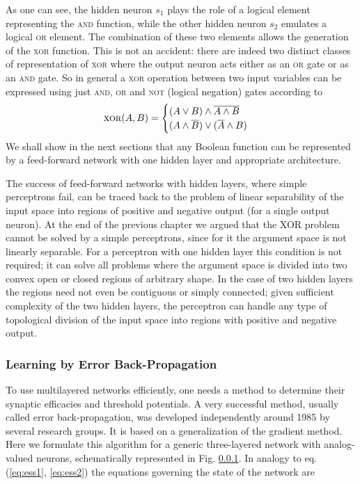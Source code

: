 As one can see, the hidden neuron $s_1$ plays the role of a logical element representing the \textsc{and} function, while the other hidden neuron $s_2$ emulates a logical \textsc{or} element. The combination of these two elements allows the generation of the \textsc{xor} function. This is not an accident: there are indeed two distinct classes of representation of \textsc{xor} where the output neuron acts either as an \textsc{or} gate or as an \textsc{and} gate. So in general a \textsc{xor} operation between two input variables can be expressed using just \textsc{and}, \textsc{or} and \textsc{not} (logical negation) gates according to
\begin{equation}
\operatorname{\textsc{xor}}(A,B)=\begin{cases}
(A\lor B)\land\overline{A\land B}\\
(A\land\overline{B})\lor(\overline{A}\land B)
\end{cases}
\end{equation}
We shall show in the next sections that any Boolean function can be represented by a feed-forward network with one hidden layer and appropriate architecture.

The success of feed-forward networks with hidden layers, where simple perceptrons fail, can be traced back to the problem of linear separability of the input space into regions of positive and negative output (for a single output neuron). At the end of the previous chapter we argued that the XOR problem cannot be solved by a simple perceptrons, since for it the argument space is not linearly separable. For a perceptron with one hidden layer this condition is not required; it can solve all problems where the argument space is divided into two convex open or closed regions of arbitrary shape. In the case of two hidden layers the regions need not even be contiguous or simply connected;
given sufficient complexity of the two hidden layers, the perceptron can handle any type of topological division of the input space into regions with positive and negative output.

\subsubsection{Learning by Error Back-Propagation}
To use multilayered networks efficiently, one needs a method to determine their synaptic efficacies and threshold potentials. A very successful method, usually called error back-propagation, was developed independently around 1985 by several research groups. It is based on a generalization of the gradient method. Here we formulate this algorithm for a generic three-layered network with analog-valued neurons, schematically represented in Fig. \ref{}. In analogy to eq. (\ref{eq:ess1}, \ref{eq:ess2}) the equations governing the state of the network are


